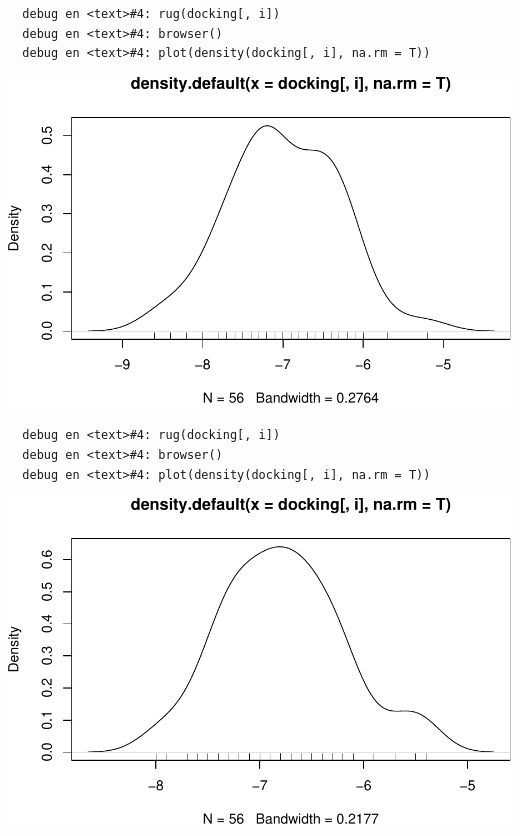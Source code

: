 \documentclass[12pt,twoside]{reedthesis}
\begin{document}
  \begin{verbatim}
  debug en <text>#4: rug(docking[, i])
  debug en <text>#4: browser()
  debug en <text>#4: plot(density(docking[, i], na.rm = T))
  \end{verbatim}
  
  \begin{center}\includegraphics{tesis_files/figure-latex/johan-5} \end{center}
  
  \begin{verbatim}
  debug en <text>#4: rug(docking[, i])
  debug en <text>#4: browser()
  debug en <text>#4: plot(density(docking[, i], na.rm = T))
  \end{verbatim}
  
  \begin{center}\includegraphics{tesis_files/figure-latex/johan-6} \end{center}
  
\end{document}
